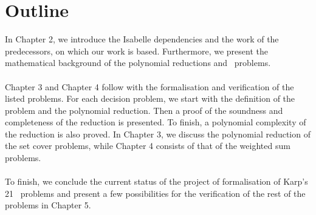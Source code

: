 \section{Outline}
In Chapter 2, we introduce the Isabelle dependencies and the work of the predecessors, on which our work is based. Furthermore, we present the mathematical background of the polynomial reductions and \NPH\ problems.\\\\
Chapter 3 and Chapter 4 follow with the formalisation and verification of the listed problems. For each decision problem, we start with the definition of the problem and the polynomial reduction. Then a proof of the soundness and completeness of the reduction is presented. To finish, a polynomial complexity of the reduction is also proved. In Chapter 3, we discuss the polynomial reduction of the set cover problems, while Chapter 4 consists of that of the weighted sum problems.\\\\
To finish, we conclude the current status of the project of formalisation of Karp's 21 \NPH\ problems and present a few possibilities for the verification of the rest of the problems in Chapter 5.
